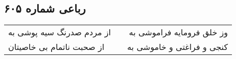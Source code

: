 \begin{center}
\section*{رباعی شماره ۶۰۵}
\label{sec:sh605}
\begin{longtable}{l p{0.5cm} r}
از مردم صدرنگ سیه پوشی به
&&
وز خلق فرومایه فراموشی به
\\
از صحبت ناتمام بی خاصیتان
&&
کنجی و فراغتی و خاموشی به
\\
\end{longtable}
\end{center}

